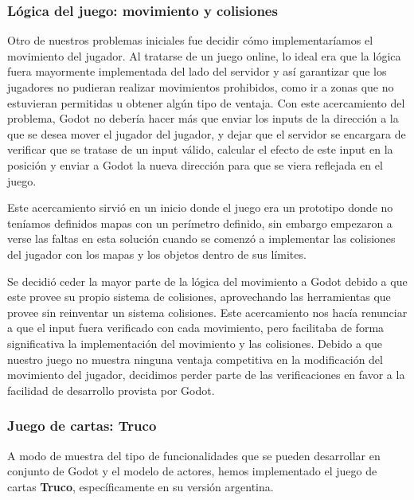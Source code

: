 \subsubsection{Lógica del juego: movimiento y colisiones}
\noindent Otro de nuestros problemas iniciales fue decidir cómo implementaríamos el movimiento del 
jugador. Al tratarse de un juego online, lo ideal era que la lógica fuera mayormente implementada del 
lado del servidor y así garantizar que los jugadores no pudieran realizar movimientos prohibidos, como 
ir a zonas que no estuvieran permitidas u obtener algún tipo de ventaja. Con este acercamiento del 
problema, Godot no debería hacer más que enviar los inputs de la dirección a la que se desea mover el 
jugador del jugador, y dejar que el 
servidor se encargara de verificar que se tratase de un input válido, calcular el efecto de este 
input en la posición y enviar a Godot la nueva dirección para que se viera reflejada en el juego.

Este acercamiento sirvió en un inicio donde el juego era un prototipo donde no teníamos definidos 
mapas con un perímetro definido, sin embargo empezaron a verse las faltas en esta solución cuando 
se comenzó a implementar las colisiones del jugador con los mapas y los objetos dentro de sus límites.

Se decidió ceder la mayor parte de la lógica del movimiento a Godot debido a que este provee 
su propio sistema de colisiones, aprovechando las herramientas que provee sin reinventar un sistema 
colisiones. Este acercamiento nos hacía renunciar a que el input fuera 
verificado con cada movimiento, pero facilitaba de forma significativa la implementación del 
movimiento y las colisiones. Debido a que nuestro juego no muestra ninguna ventaja competitiva 
en la modificación del movimiento del jugador, decidimos perder parte de las verificaciones en 
favor a la facilidad de desarrollo provista por Godot.


\subsubsection{Juego de cartas: Truco}
\noindent A modo de muestra del tipo de funcionalidades que se pueden desarrollar en conjunto de 
Godot y el modelo de actores, hemos implementado el juego de cartas \textbf{Truco}, específicamente 
en su versión argentina.


